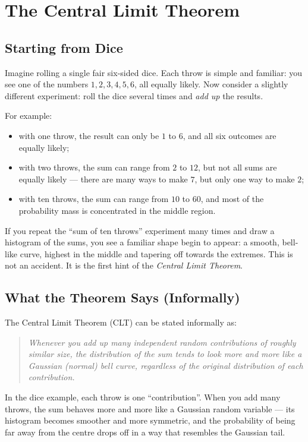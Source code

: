 \chapter{The Central Limit Theorem}

\section{Starting from Dice}
Imagine rolling a single fair six-sided dice.  Each throw is simple and familiar: you see one of the numbers \(1,2,3,4,5,6\), all equally likely.  Now consider a slightly different experiment: roll the dice several times and \emph{add up} the results.

For example:
\begin{itemize}
  \item with one throw, the result can only be \(1\) to \(6\), and all six outcomes are equally likely;
  \item with two throws, the sum can range from \(2\) to \(12\), but not all sums are equally likely --- there are many ways to make \(7\), but only one way to make \(2\);
  \item with ten throws, the sum can range from \(10\) to \(60\), and most of the probability mass is concentrated in the middle region.
\end{itemize}

If you repeat the ``sum of ten throws'' experiment many times and draw a histogram of the sums, you see a familiar shape begin to appear: a smooth, bell-like curve, highest in the middle and tapering off towards the extremes.  This is not an accident.  It is the first hint of the \emph{Central Limit Theorem}.

\section{What the Theorem Says (Informally)}
The Central Limit Theorem (CLT) can be stated informally as:
\begin{quote}
  \emph{Whenever you add up many independent random contributions of roughly similar size, the distribution of the sum tends to look more and more like a Gaussian (normal) bell curve, regardless of the original distribution of each contribution.}
\end{quote}

In the dice example, each throw is one ``contribution''.  When you add many throws, the sum behaves more and more like a Gaussian random variable --- its histogram becomes smoother and more symmetric, and the probability of being far away from the centre drops off in a way that resembles the Gaussian tail.

